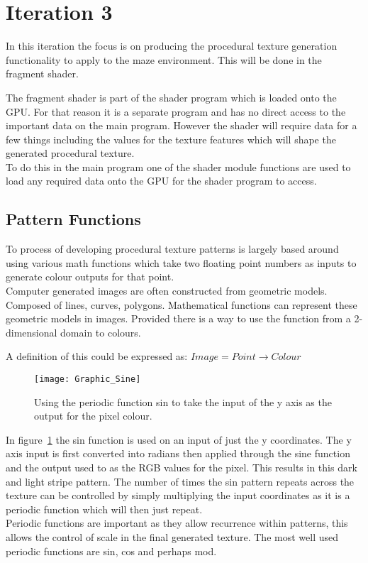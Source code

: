 \documentclass{report}
\begin{document}
\section{Iteration 3}

In this iteration the focus is on producing the procedural texture generation functionality to apply to the maze environment. This will be done in the fragment shader.

The fragment shader is part of the shader program which is loaded onto the GPU. For that reason it is a separate program and has no direct access to the
important data on the main program. However the shader will require data for a few things including the values for the texture features which will shape
the generated procedural texture.\\
To do this in the main program one of the shader module functions are used to load any required data onto the GPU for the shader program to access.

\subsection{Pattern Functions}

To process of developing procedural texture patterns is largely based around using various math functions which take two floating point numbers as inputs to generate 
colour outputs for that point.\\
Computer generated images are often constructed from geometric models. Composed of lines, curves, polygons. Mathematical functions
can represent these geometric models in images. Provided there is a way to use the function from a 2-dimensional domain to
colours. \citep{karczmarczuk2002functional}

\centerline{A definition of this could be expressed as: $Image = Point \rightarrow Colour$ \quad \citep{Elliott03FOP}}

\begin{figure}
\centerline{\texttt{[image: Graphic\_Sine]}}
\caption[Math Function Pattern: Sine]{}
\label{fgr:mfps}
\centerline{Using the periodic function sin to take the input of the y axis as the output for the pixel colour.}
\end{figure}

In figure~\ref{fgr:mfps} the sin function is used on an input of just the y coordinates. The y axis input is first converted into radians then applied through 
the sine function and the output used to as the RGB values for the pixel. This results in this dark and light stripe pattern.
The number of times the sin pattern repeats across the texture can be controlled by simply multiplying the input coordinates as it is a periodic function which 
will then just repeat.\\
Periodic functions are important as they allow recurrence within patterns, this allows the control of scale in the final generated texture. The most well
used periodic functions are sin, cos and perhaps mod.
\end{document}
